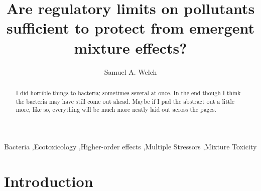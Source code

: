 \documentclass[final,1p,times]{elsarticle}
\begin{document}
\begin{frontmatter}


\title{Are regulatory limits on pollutants sufficient to protect from emergent mixture effects?}



\author{Samuel A. Welch}

\address{Silwood Park, Imperial College London, United Kingdom}

\begin{abstract}
I did horrible things to bacteria; sometimes several at once. In the end though I think the bacteria may have still come out ahead. Maybe if I pad the abstract out a little more, like so, everything will be much more neatly laid out across the pages. 
\end{abstract}

\begin{keyword}
Bacteria \sep Ecotoxicology \sep Higher-order effects \sep Multiple Stressors \sep Mixture Toxicity


\end{keyword}

\end{frontmatter}

\linenumbers

\section{Introduction}
\label{S:1}
\end{document}
